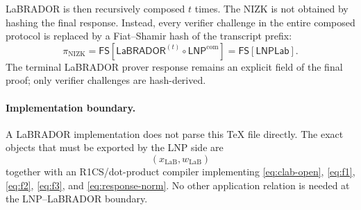 \documentclass[11pt]{article}
\newcommand{\LaB}{\mathsf{LaBRADOR}}
\newcommand{\LNP}{\mathsf{LNP}}
\newcommand{\FS}{\mathsf{FS}}
\begin{document}
LaBRADOR is then recursively composed $t$ times.  The NIZK is not obtained by
hashing the final response.  Instead, every verifier challenge in the entire
composed protocol is replaced by a Fiat--Shamir hash of the transcript prefix:
\begin{equation}
\boxed{
 \pi_{\mathrm{NIZK}}
 =\FS\!\left[
   \LaB^{(t)}\circ\LNP^{\mathrm{com}}
 \right]
 =\FS[\mathsf{LNPLab}].
 }
 \label{eq:fs-lnplab}
\end{equation}
The terminal LaBRADOR prover response remains an explicit field of the final
proof; only verifier challenges are hash-derived.

\paragraph{Implementation boundary.}
A LaBRADOR implementation does not parse this TeX file directly.  The exact
objects that must be exported by the LNP side are
\[
  (x_{\mathrm{LaB}},w_{\mathrm{LaB}})
\]
together with an R1CS/dot-product compiler implementing
\eqref{eq:clab-open}, \eqref{eq:f1}, \eqref{eq:f2}, \eqref{eq:f3}, and
\eqref{eq:response-norm}.  No other application relation is needed at the
LNP--LaBRADOR boundary.
\end{document}
